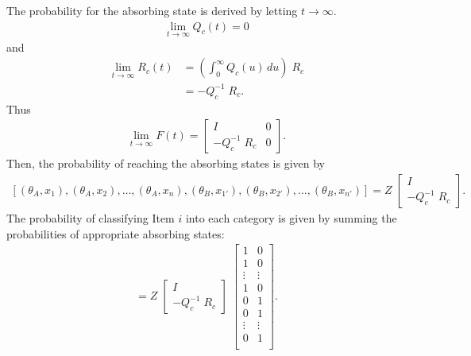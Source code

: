 \documentclass[doc]{apa6}
\begin{document}
The probability for the absorbing state is derived by letting $t \rightarrow \infty$.
\begin{align}
    \lim_{t \rightarrow \infty} Q_{c}(t) = 0
\end{align}
and
\begin{align}
    \lim_{t \rightarrow \infty} R_{c}(t) &= \left( \int_{0}^{\infty} Q_c{(u)} \, du \right) \; R_{c}\\
                                         &= - Q_{c}^{-1} \; R_{c}.
\end{align}
Thus
\begin{align}
    \lim_{t \rightarrow \infty} F(t) = \left[
        \begin{array}{cc}
            I & 0 \\
            - Q_{c}^{-1} \; R_{c} & 0
        \end{array}
    \right].
\end{align}
Then, the probability of reaching the absorbing states is given by
\begin{align}
\left[(\theta_{A}, x_{1}),  (\theta_{A}, x_{2}),  \ldots, (\theta_{A}, x_{n}),
      (\theta_{B}, x_{1'}), (\theta_{B}, x_{2'}), \ldots, (\theta_{B}, x_{n'})\right]
= Z \; \left[
        \begin{array}{c}
            I \\ - Q_{c}^{-1} \; R_{c}
        \end{array}
    \right].
\end{align}
The probability of classifying Item $i$ into each category is given by summing the probabilities of
appropriate absorbing states:
\begin{align}
    [p(\mathbb{A}), \; p(\mathbb{B})] =
        Z \; \left[
        \begin{array}{c}
            I \\ - Q_{c}^{-1} \; R_{c}
        \end{array}
    \right] \;
        \left[
            \begin{array}{cc}
                1      & 0      \\
                1      & 0      \\
                \vdots & \vdots \\
                1      & 0      \\
                0      & 1      \\
                0      & 1      \\
                \vdots & \vdots \\
                0      & 1      \\
            \end{array}
        \right].
\end{align}
\end{document}
